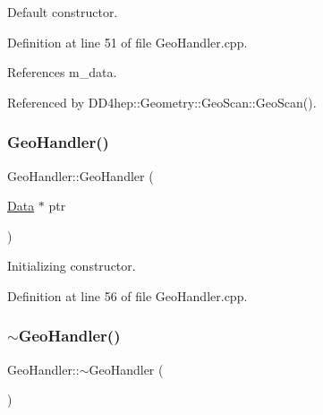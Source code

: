 Default constructor. 



Definition at line 51 of file Geo\+Handler.\+cpp.



References m\+\_\+data.



Referenced by D\+D4hep\+::\+Geometry\+::\+Geo\+Scan\+::\+Geo\+Scan().

\hypertarget{class_d_d4hep_1_1_geometry_1_1_geo_handler_a247d32d9a08a552eb6716c573c062eb1}{}\label{class_d_d4hep_1_1_geometry_1_1_geo_handler_a247d32d9a08a552eb6716c573c062eb1} 
\subsubsection{\texorpdfstring{Geo\+Handler()}{GeoHandler()}\hspace{0.1cm}{\footnotesize\ttfamily [3/3]}}
{\footnotesize\ttfamily Geo\+Handler\+::\+Geo\+Handler (\begin{DoxyParamCaption}\item[{\hyperlink{class_d_d4hep_1_1_geometry_1_1_geo_handler_types_a568935b7e878d3ea9fe97a2ecf33d641}{Data} $\ast$}]{ptr }\end{DoxyParamCaption})}



Initializing constructor. 



Definition at line 56 of file Geo\+Handler.\+cpp.

\hypertarget{class_d_d4hep_1_1_geometry_1_1_geo_handler_abb339356d911217c99b0869573d5284f}{}\label{class_d_d4hep_1_1_geometry_1_1_geo_handler_abb339356d911217c99b0869573d5284f} 
\subsubsection{\texorpdfstring{$\sim$\+Geo\+Handler()}{~GeoHandler()}}
{\footnotesize\ttfamily Geo\+Handler\+::$\sim$\+Geo\+Handler (\begin{DoxyParamCaption}{ }\end{DoxyParamCaption})\hspace{0.3cm}{\ttfamily [virtual]}}



